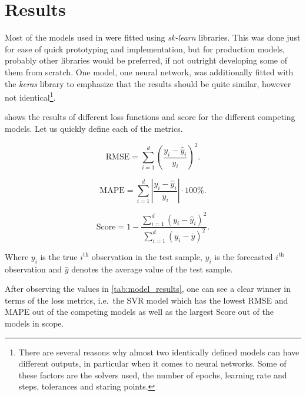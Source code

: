 \documentclass[11pt]{article}
\begin{document}
\section{Results}\label{sec:results}

Most of the models used in  were fitted using \emph{sk-learn} libraries.
This was done just for ease of quick prototyping and implementation, but for production models, probably
other libraries would be preferred, if not outright developing some of them from scratch.
One model, one neural network, was additionally fitted with the \emph{keras} library to emphasize that the results
should be quite similar, however not identical\footnote{There are several reasons why almost two identically defined
models can have different outputs, in particular when it comes to neural networks. Some of these factors are the
solvers used, the number of epochs, learning rate and steps, tolerances and staring points.}.



 shows the results of different loss functions and score for the different competing models.
Let us quickly define each of the metrics.

\begin{equation}
  \mathrm{RMSE} = \sum_{i=1}^{d}
  \left(\frac{y_{i}-\hat{y}_{i}}{y_{i}}
  \right)^2.
\label{eq:rmse}
\end{equation}

\begin{equation}
  \mathrm{MAPE} = \sum_{i=1}^{d}
  \left|\frac{y_{i}-\hat{y}_{i}}{y_{i}}
  \right| \cdot 100\%.
\label{eq:mape}
\end{equation}

\begin{equation}
  \mathrm{Score} = 1 - \frac{\sum_{i=1}^{d}(y_{i}-\hat{y}_{i})^2}{\sum_{i=1}^{d}(y_{i}-\bar{y})^2}.
\label{eq:score}
\end{equation}

Where $y_{i}$ is the true $i^{\text{th}}$ observation in the test sample, $\hat{y}_{i}$ is the forecasted
$i^{\text{th}}$ observation and $\bar{y}$ denotes the average value of the test sample.

After observing the values in \cref{tab:model_results}, one can see a clear winner in terms of the loss
metrics, i.e.\ the SVR model which has the lowest RMSE and MAPE out of the competing models as well as
the largest Score out of the models in scope.
\end{document}
